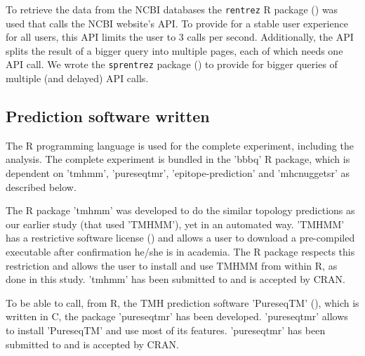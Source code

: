 To retrieve the data from the NCBI databases the
\verb;rentrez; R package (\cite{rentrez}) was used
that calls the NCBI website's API. To provide for a 
stable user experience for all users, 
this API limits the user to 3 calls per second.
Additionally, the API splits the result of a bigger
query into multiple pages, each of which needs one API call.
We wrote the \verb;sprentrez; package (\cite{sprentrez}) to provide for 
bigger queries of multiple (and delayed) API calls.

\subsection{Prediction software written}

The R programming language is used for the complete 
experiment, including the analysis.
The complete experiment is bundled in the 'bbbq' R package,
which is dependent on 'tmhmm', 'pureseqtmr', 
'epitope-prediction' and 'mhcnuggetsr'
as described below.


The R package 'tmhmm' was developed to do the similar topology
predictions as our earlier study (that used 'TMHMM'), yet in an automated way.
'TMHMM' has a restrictive software license (\cite{krogh2001predicting}) and allows a user
to download a pre-compiled executable after confirmation he/she
is in academia. The R package respects this restriction
and allows the user to install and use TMHMM from within R,
as done in this study.
'tmhmm' has been submitted to and is accepted by CRAN. 


To be able to call, from R, the TMH prediction 
software 'PureseqTM' (\cite{wang2019efficient}),
which is written in C, the package 'pureseqtmr' has been developed. 
'pureseqtmr' allows to install 'PureseqTM' and use most of its features.
'pureseqtmr' has been submitted to and is accepted by CRAN.


